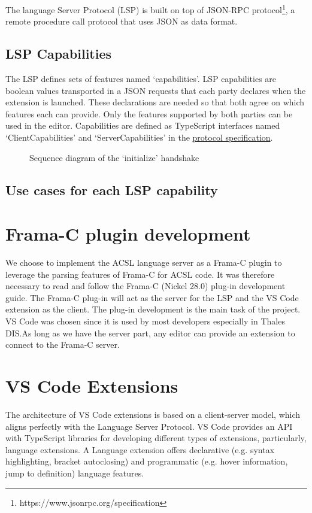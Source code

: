 \documentclass[10pt]{article}
\begin{document}
\begin{singlespace}
The language Server Protocol (LSP) is built on top of JSON-RPC protocol\footnote{https://www.jsonrpc.org/specification}, a remote procedure call protocol that uses JSON as data format.

\color{magenta}
\subsection{LSP Capabilities}
The LSP defines sets of features named `capabilities'. LSP capabilities are boolean values transported in a JSON requests that each party declares when the extension is launched.
These declarations are needed so that both agree on which features each can provide. Only the features supported by both parties can be used in the editor. 
Capabilities are defined as TypeScript interfaces named `ClientCapabilities' and `ServerCapabilities' in the \href{https://microsoft.github.io/language-server-protocol/specifications/lsp/3.17/specification/#capabilities}{protocol specification}.
\begin{figure}[H]
	\centering
	\caption{Sequence diagram of the `initialize' handshake}
\end{figure}

\subsection{Use cases for each LSP capability}

\color{black}

\section{Frama-C plugin development}
We choose to implement the ACSL language server as a Frama-C plugin to leverage the parsing features of Frama-C for ACSL code. It was therefore necessary to read and follow the Frama-C (Nickel 28.0) plug-in development guide. The Frama-C plug-in will act as the server for the LSP and the VS Code extension as the client. The plug-in development is the main task of the project. VS Code was chosen since it is used by most developers especially in Thales DIS.\@ As long as we have the server part, any editor can provide an extension to connect to the Frama-C server.

\section{VS Code Extensions}
The architecture of VS Code extensions is based on a client-server model, which aligns perfectly with the Language Server Protocol. VS Code provides an API with TypeScript libraries for developing different types of extensions, particularly, language extensions. 
A Language extension offers declarative (e.g.\: syntax highlighting, bracket autoclosing) and programmatic (e.g.\: hover information, jump to definition) language features. 


\end{singlespace}
\end{document}
